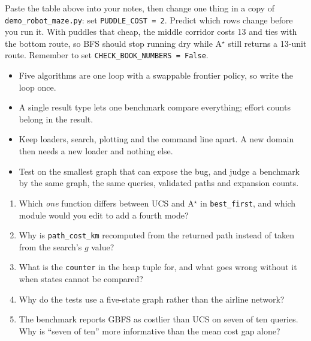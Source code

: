 \begin{tryit}
Paste the table above into your notes, then change one thing in a copy of \texttt{demo\_robot\_maze.py}: set \texttt{PUDDLE\_COST = 2}. Predict which rows change before you run it. With puddles that cheap, the middle corridor costs 13 and ties with the bottom route, so BFS should stop running dry while A$^\star$ still returns a 13-unit route. Remember to set \texttt{CHECK\_BOOK\_NUMBERS = False}.
\end{tryit}

\begin{chapterrecap}
\begin{itemize}
  \item Five algorithms are one loop with a swappable frontier policy, so write the loop once.
  \item A single result type lets one benchmark compare everything; effort counts belong in the result.
  \item Keep loaders, search, plotting and the command line apart. A new domain then needs a new loader and nothing else.
  \item Test on the smallest graph that can expose the bug, and judge a benchmark by the same graph, the same queries, validated paths and expansion counts.
\end{itemize}
\end{chapterrecap}

\begin{quickcheck}
\begin{enumerate}
  \item Which \emph{one} function differs between UCS and A$^\star$ in \texttt{best\_first}, and which module would you edit to add a fourth mode?
  \item Why is \texttt{path\_cost\_km} recomputed from the returned path instead of taken from the search's $g$ value?
  \item What is the \texttt{counter} in the heap tuple for, and what goes wrong without it when states cannot be compared?
  \item Why do the tests use a five-state graph rather than the airline network?
  \item The benchmark reports GBFS as costlier than UCS on seven of ten queries. Why is ``seven of ten'' more informative than the mean cost gap alone?
\end{enumerate}
\end{quickcheck}
